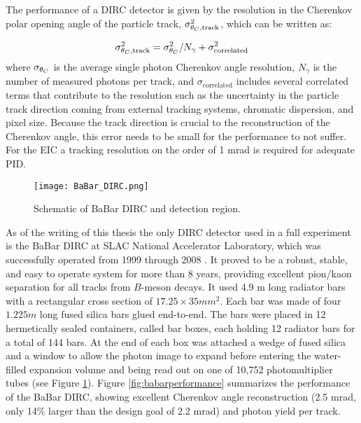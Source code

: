 The performance of a DIRC detector is given by the resolution in the Cherenkov polar opening angle of the particle track, $\sigma_{\theta_{C},\text{track}}^2$, which can be written as:

\begin{equation}
	\sigma_{\theta_{C},\text{track}}^2 = \sigma_{\theta_{C}}^2 / N_{\gamma} + \sigma_{\text{correlated}}^2
	\label{eq:performance}
\end{equation}
%
where $\sigma_{\theta_{C}}$ is the average single photon Cherenkov angle resolution, $N_{\gamma}$ is the number of measured photons per track, and $\sigma_{\text{correlated}}$ includes several correlated terms that contribute to the resolution such as the uncertainty in the particle track direction coming from external tracking systems, chromatic dispersion, and pixel size. Because the track direction is crucial to the reconstruction of the Cherenkov angle, this error needs to be small for the performance to not suffer. For the EIC a tracking resolution on the order of 1 mrad is required for adequate PID.

\begin{figure}[!htb]
	\centering
	\texttt{[image: BaBar\_DIRC.png]}
	\caption{Schematic of BaBar DIRC and detection region.}
	\label{fig:babardirc}
\end{figure}

As of the writing of this thesis the only DIRC detector used in a full experiment is the BaBar DIRC at SLAC National Accelerator Laboratory, which was successfully operated from 1999 through 2008 \cite{BaBarDIRC}. It proved to be a robust, stable, and easy to operate system for more than 8 years, providing excellent pion/kaon separation for all tracks from $B$-meson decays. It used 4.9 m long radiator bars with a rectangular cross section of $17.25 \times 35 \unit{mm}^2$. Each bar was made of four $1.225\unit{m}$ long fused silica bars glued end-to-end. The bars were placed in 12 hermetically sealed containers, called bar boxes, each holding 12 radiator bars for a total of 144 bars. At the end of each box was attached a wedge of fused silica and a window to allow the photon image to expand before entering the water-filled expansion volume and being read out on one of 10,752 photomultiplier tubes (see Figure \ref{fig:babardirc}). Figure \ref{fig:babarperformance} summarizes the performance of the BaBar DIRC, showing excellent Cherenkov angle reconstruction (2.5 mrad, only 14\% larger than the design goal of 2.2 mrad) and photon yield per track.


